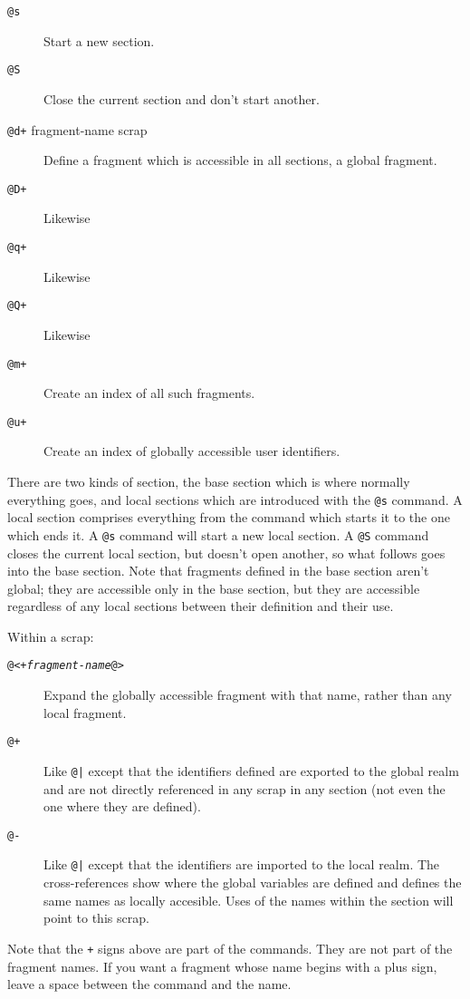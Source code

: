 \documentclass[a4paper]{report}
\begin{document}
\begin{description}
\item[{\tt @s}] Start a new section.
\item[{\tt @S}] Close the current section and don't start another.
\item[{\tt @d+} fragment-name scrap] Define a fragment which is
accessible in all sections, a global fragment.
\item[{\tt @D+}] Likewise
\item[{\tt @q+}] Likewise
\item[{\tt @Q+}] Likewise
\item[{\tt @m+}] Create an index of all such fragments.
\item[{\tt @u+}] Create an index of globally accessible
user identifiers.
\end{description}

There are two kinds of section, the base section which is where
normally everything goes, and local sections which are introduced with
the {\tt @s} command. A local section comprises everything from the
command which starts it to the one which ends it. A {\tt @s} command
will start a new local section. A {\tt @S} command closes the current
local section, but doesn't open another, so what follows goes into the
base section. Note that fragments defined in the base section aren't
global; they are accessible only in the base section, but they are
accessible regardless of any local sections between their definition
and their use.

Within a scrap:
\begin{description}
\item[\tt @<+{\em fragment-name\/}@>]
Expand the globally accessible fragment with that name, rather than
any local fragment.
\item[{\tt @+}] Like \verb"@|" except that the identifiers
defined are exported to the global realm and are not directly
referenced in any scrap in any section (not even the one where
they are defined).
\item[{\tt @-}] Like \verb"@|" except that the identifiers
are imported to the local realm. The cross-references show where
the global variables are defined and defines the same names as
locally accesible. Uses of the names within the section will
point to this scrap.
\end{description}

Note that the \verb"+" signs above are part of the commands. They
are not part of the fragment names. If you want a fragment whose name
begins with a plus sign, leave a space between the command and the
name.
\end{document}
